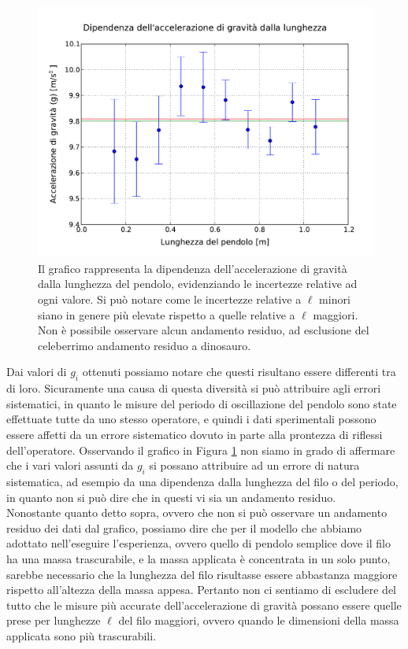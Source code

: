 \begin{figure}
	\centering
	\includegraphics[width=120mm]{immagini/gravita.pdf}
	\caption{Il grafico rappresenta la dipendenza dell'accelerazione di gravità dalla lunghezza del pendolo, evidenziando le incertezze relative ad ogni valore. Si può notare come le incertezze relative a $\ell$ minori siano in genere più elevate rispetto a quelle relative a $\ell$ maggiori. Non è possibile osservare alcun andamento residuo, ad esclusione del celeberrimo andamento residuo a dinosauro.}
	\label{fig:graf_gravita}
\end{figure}

Dai valori di $g_i$ ottenuti possiamo notare che questi risultano essere differenti tra di loro. Sicuramente una causa di questa diversità si può attribuire agli errori sistematici, in quanto le misure del periodo di oscillazione del pendolo sono state effettuate tutte da uno stesso operatore, e quindi i dati sperimentali possono essere affetti da un errore sistematico dovuto in parte alla prontezza di riflessi dell'operatore. %
Osservando il grafico in Figura \ref{fig:graf_gravita} non siamo in grado di affermare che i vari valori assunti da $g_i$ si possano attribuire ad un errore di natura sistematica, ad esempio da una dipendenza dalla lunghezza del filo o del periodo, in quanto non si può dire che in questi vi sia un andamento residuo.\\
Nonostante quanto detto sopra, ovvero che non si può osservare un andamento residuo dei dati dal grafico, possiamo dire che per il modello che abbiamo adottato nell'eseguire l'esperienza, ovvero quello di pendolo semplice dove il filo ha una massa trascurabile, e la massa applicata è concentrata in un solo punto, sarebbe necessario che la lunghezza del filo risultasse essere abbastanza maggiore rispetto all'altezza della massa appesa. Pertanto non ci sentiamo di escludere del tutto che le misure più accurate dell'accelerazione di gravità possano essere quelle prese per lunghezze $\ell$ del filo maggiori, ovvero quando le dimensioni della massa applicata sono più trascurabili.
